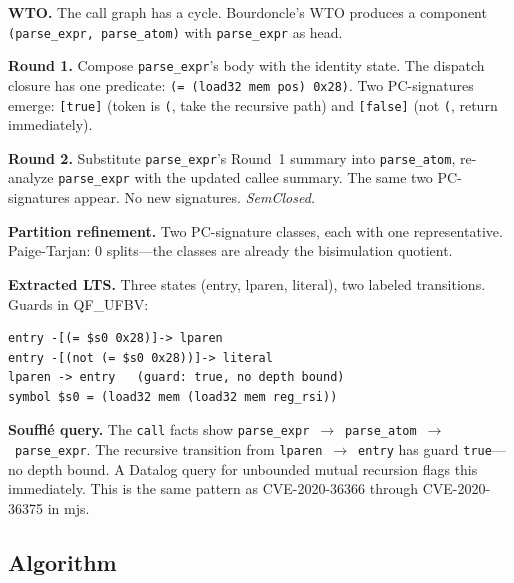 \documentclass[conference]{./template/IEEEtran}
\begin{document}
\noindent\textbf{WTO.} The call graph has a cycle. Bourdoncle's WTO produces a component \texttt{(parse\_expr, parse\_atom)} with \texttt{parse\_expr} as head.

\noindent\textbf{Round 1.} Compose \texttt{parse\_expr}'s body with the identity state. The dispatch closure has one predicate: \texttt{(= (load32 mem pos) 0x28)}. Two PC-signatures emerge: \texttt{[true]} (token is \texttt{(}, take the recursive path) and \texttt{[false]} (not \texttt{(}, return immediately).

\noindent\textbf{Round 2.} Substitute \texttt{parse\_expr}'s Round~1 summary into \texttt{parse\_atom}, re-analyze \texttt{parse\_expr} with the updated callee summary. The same two PC-signatures appear. No new signatures. \emph{SemClosed.}

\noindent\textbf{Partition refinement.} Two PC-signature classes, each with one representative. Paige-Tarjan: 0 splits---the classes are already the bisimulation quotient.

\noindent\textbf{Extracted LTS.} Three states (entry, lparen, literal), two labeled transitions. Guards in QF\_UFBV:

\begin{lstlisting}[basicstyle=\ttfamily\scriptsize,frame=single]
entry -[(= $s0 0x28)]-> lparen
entry -[(not (= $s0 0x28))]-> literal
lparen -> entry   (guard: true, no depth bound)
symbol $s0 = (load32 mem (load32 mem reg_rsi))
\end{lstlisting}

\noindent\textbf{Souffl\'{e} query.} The \texttt{call} facts show \texttt{parse\_expr}~$\to$~\texttt{parse\_atom}~$\to$~\texttt{parse\_expr}. The recursive transition from \texttt{lparen}~$\to$~\texttt{entry} has guard \texttt{true}---no depth bound. A Datalog query for unbounded mutual recursion flags this immediately. This is the same pattern as CVE-2020-36366 through CVE-2020-36375 in mjs.

\subsection{Algorithm}
\end{document}
